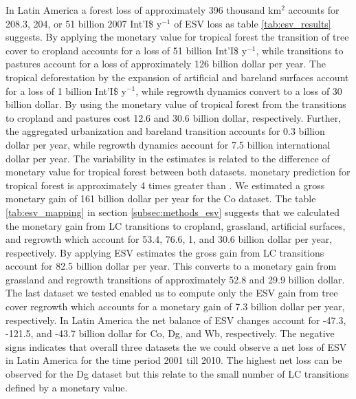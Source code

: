 		In Latin America a forest loss of approximately 396 thousand km$^2$ accounts for 208.3, 204, or 51 billion 2007 Int'I\$ y$^{-1}$ of \ac{ESV} loss as table \ref{tab:esv_results} suggests. By applying the \citet{Costanza2014} monetary value for tropical forest the transition of tree cover to cropland accounts for a loss of 51 billion Int'I\$ y$^{-1}$, while transitions to pastures account for a loss of approximately 126 billion dollar per year. The tropical deforestation by the expansion of artificial and bareland surfaces account for a loss of 1 billion Int'I\$ y$^{-1}$, while regrowth dynamics convert to a loss of 30 billion dollar. By using the monetary value of tropical forest from \citet{Siikamaki2015} the transitions to cropland and pastures cost 12.6 and 30.6 billion dollar, respectively. Further, the aggregated urbanization and bareland transition accounts for 0.3 billion dollar per year, while regrowth dynamics account for 7.5 billion international dollar per year. The variability in the estimates is related to the difference of monetary value for tropical forest between both datasets. \citeauthor{Costanza2014} monetary prediction for tropical forest is approximately 4 times greater than \citeauthor{Siikamaki2015}. We estimated a gross monetary gain of 161 billion dollar per year for the Co dataset. The table \ref{tab:esv_mapping} in section \ref{subsec:methods_esv} suggests that we calculated the monetary gain from \ac{LC} transitions to cropland, grassland, artificial surfaces, and regrowth which account for 53.4, 76.6, 1, and 30.6 billion dollar per year, respectively. By applying \citet{Groot2012} \ac{ESV} estimates the gross gain from \ac{LC} transitions account for 82.5 billion dollar per year. This converts to a monetary gain from grassland and regrowth transitions of approximately 52.8 and 29.9 billion dollar. The last dataset we tested enabled us to compute only the \ac{ESV} gain from tree cover regrowth which accounts for a monetary gain of 7.3 billion dollar per year, respectively. In Latin America the net balance of \ac{ESV} changes account for -47.3, -121.5, and -43.7 billion dollar for Co, Dg, and Wb, respectively. The negative signs indicates that overall three datasets the we could observe a net loss of \ac{ESV} in Latin America for the time period 2001 till 2010. The highest net loss can be observed for the Dg dataset but this relate to the small number of \ac{LC} transitions defined by a monetary value.

